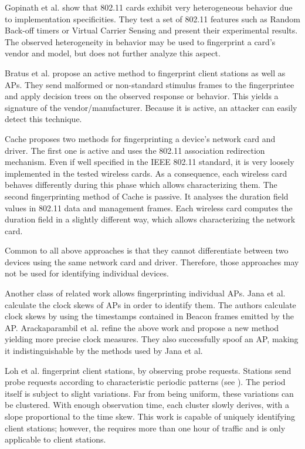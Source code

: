 \documentclass[10pt, conference, compsocconf, letterpaper]{IEEEtran}
\begin{document}
Gopinath et al. \cite{Gopinath:WiNTECH} show that 802.11 cards exhibit very 
heterogeneous behavior due to implementation specificities. They test a set of 802.11 features such
as Random Back-off timers or Virtual Carrier Sensing and present their experimental results.
The observed heterogeneity in behavior may be used 
to fingerprint a card's vendor and model, but does not further analyze this aspect.

Bratus et al. \cite{Bratus:WISEC} propose an active method to fingerprint client stations as well as APs.
They send malformed or non-standard stimulus frames to the fingerprintee and apply decision trees on the observed response or behavior.
This yields a signature of the vendor/manufacturer.
Because it is active, an attacker can easily detect this technique.

Cache \cite{Cache:MasterThesis} proposes two methods for fingerprinting a device's network card and driver. 
The first one is active and uses the 802.11 association redirection mechanism. Even if well specified in 
the IEEE 802.11 standard, it is very loosely implemented in the tested wireless cards. As a consequence,  
each wireless card behaves differently during this phase which allows characterizing them. 
The second fingerprinting method of Cache is passive. It analyses the duration field values in 
802.11 data and management frames. Each wireless 
card computes the duration field in a slightly different way, which allows characterizing
the network card. 

Common to all above approaches is that they cannot differentiate between two devices using the same network card and driver. Therefore, those approaches may not be used for identifying individual devices.

Another class of related work allows fingerprinting individual APs.
Jana et al. \cite{Jana:Mobicom} calculate the clock skews of APs in order to identify them. 
The authors calculate clock skews by using the timestamps contained in Beacon frames 
emitted by the AP. 
Arackaparambil et al. \cite{Arackaparambil:Wisec} refine the above work and propose a new method yielding more 
precise clock measures. They also successfully spoof an AP, making it indistinguishable 
by the methods used by Jana et al. 


Loh et al. \cite{Loh:WiSec} fingerprint client stations, by observing 
probe requests. Stations send probe requests according to characteristic 
periodic patterns (see \cite{Franklin:Security06}).  The period itself is subject to slight variations. 
Far from being uniform, these variations can be clustered. 
With enough observation time, each cluster slowly derives, with a slope proportional to the time skew. 
This work is capable of uniquely identifying client stations; however, the requires more than one hour of traffic and
is only applicable to client stations.
\end{document}
